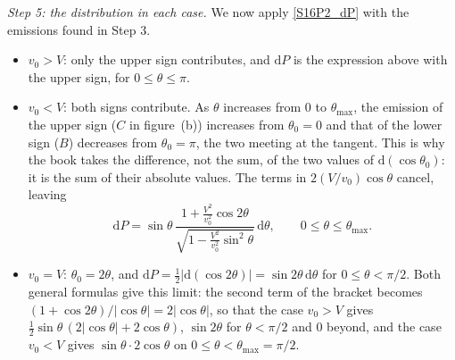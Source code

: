 \begin{problem}[title={Lab angular distribution of decay products}]
{\textit{Step 5: the distribution in each case.} We now apply \eqref{S16P2_dP} with the emissions found in Step 3.
\begin{itemize}
    \item $v_0>V$: only the upper sign contributes, and $\mathrm{d}P$ is the expression above with the upper sign, for $0 \leq \theta \leq \pi$.
    \item $v_0<V$: both signs contribute. As $\theta$ increases from $0$ to $\theta_{\mathrm{max}}$, the emission of the upper sign ($C$ in figure~(b)) increases from $\theta_0 = 0$ and that of the lower sign ($B$) decreases from $\theta_0 = \pi$, the two meeting at the tangent. This is why the book takes the difference, not the sum, of the two values of $\mathrm{d}(\cos{\theta_0})$: it is the sum of their absolute values. The terms in $2(V/v_0)\cos{\theta}$ cancel, leaving
    \begin{equation*}
        \mathrm{d}P = \sin{\theta}\,\frac{1+\frac{V^2}{v_0^2}\cos{2\theta}}{\sqrt{1-\frac{V^2}{v_0^2}\sin^2{\theta}}}\,\mathrm{d}\theta, \qquad 0 \leq \theta \leq \theta_{\mathrm{max}}.
    \end{equation*}
    \item $v_0=V$: $\theta_0 = 2\theta$, and $\mathrm{d}P = \frac{1}{2}|\mathrm{d}(\cos{2\theta})| = \sin{2\theta}\,\mathrm{d}\theta$ for $0 \leq \theta < \pi/2$. Both general formulas give this limit: the second term of the bracket becomes $(1+\cos{2\theta})/|\cos{\theta}| = 2|\cos{\theta}|$, so that the case $v_0>V$ gives $\frac{1}{2}\sin{\theta}\,(2|\cos{\theta}|+2\cos{\theta})$, \ie $\sin{2\theta}$ for $\theta<\pi/2$ and $0$ beyond, and the case $v_0<V$ gives $\sin{\theta}\cdot 2\cos{\theta}$ on $0 \leq \theta < \theta_{\mathrm{max}} = \pi/2$.
\end{itemize}

}
\end{problem}
